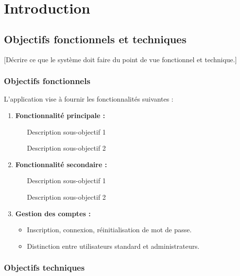 \documentclass[12pt, a4paper]{article}
\begin{document}
\makecoverpage
\makesommaire

\section{Introduction}

\subsection{Objectifs fonctionnels et techniques}

[Décrire ce que le système doit faire du point de vue fonctionnel et technique.]

\subsubsection{Objectifs fonctionnels}

L'application vise à fournir les fonctionnalités suivantes :

\begin{enumerate}
  \item \textbf{Fonctionnalité principale :}
    \begin{itemize}
      \item [Description sous-objectif 1]
      \item [Description sous-objectif 2]
    \end{itemize}

  \item \textbf{Fonctionnalité secondaire :}
    \begin{itemize}
      \item [Description sous-objectif 1]
      \item [Description sous-objectif 2]
    \end{itemize}

  \item \textbf{Gestion des comptes :}
    \begin{itemize}
      \item Inscription, connexion, réinitialisation de mot de passe.
      \item Distinction entre utilisateurs standard et administrateurs.
    \end{itemize}
\end{enumerate}

\subsubsection{Objectifs techniques}
\end{document}
